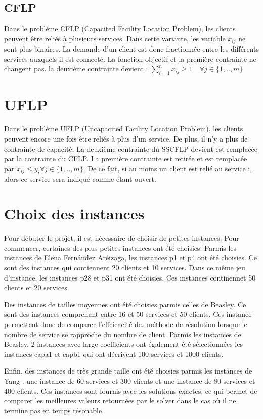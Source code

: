 \subsection{CFLP}

Dans le problème CFLP (Capacited Facility Location Problem), les clients peuvent être reliés à plusieurs services. Dans cette variante, les variable $x_{ij}$ ne sont plus binaires. La demande d'un client est donc fractionnée entre les différents services auxquels il est connecté. La fonction objectif et la première contrainte ne changent pas. la deuxième contrainte devient :
$ \sum \limits_{i=1}^n x_{ij} \geq 1 \quad \forall j \in \{1,..,m\}$

\section {UFLP}

Dans le problème UFLP (Uncapacited Facility Location Problem), les clients peuvent encore une fois être reliés à plus d'un service. De plus, il n'y a plus de contrainte de capacité.
La deuxième contrainte du SSCFLP devient est remplacée par la contrainte du CFLP.
La première contrainte est retirée et est remplacée par
$ x_{ij} \leq y_i \forall j \in \{1,..,m\}$. De ce fait, si au moins un client est relié au service i, alors ce service sera indiqué comme étant ouvert.


\section{Choix des instances}

Pour débuter le projet, il est nécessaire de choisir de petites instances.
Pour commencer, certaines des plus petites instances ont été choisies.
Parmis les instances de Elena Fernández Aréizaga, les instances p1 et p4 ont été choisies. Ce sont des instances qui contiennent 20 clients et 10 services.
Dans ce même jeu d'instance, les instances p28 et p31 ont été choisies. Ces instances continennet 50 clients et 20 services. \newline

Des instances de tailles moyennes ont été choisies parmis celles de Beasley. Ce sont des instances comprenant entre 16 et 50 services et 50 clients.
Ces instance permettent donc de comparer l'effcicacité des méthode de résolution lorsque le nombre de service se rapproche du nombre de client.
Parmis les instances de Beasley, 2 instances avec large coefficients ont également été sélectionnées les instances capa1 et capb1 qui ont décrivent 100 services et 1000 clients. \newline

Enfin, des instances de très grande taille ont été choisies parmis les instances de Yang : une instance de 60 services et 300 clients et une instance de 80 services et 400 clients.
Ces instances sont fournis avec les solutions exactes, ce qui permet de comparer les meilleures valeurs retournées par le solver dans le cas où il ne termine pas en temps résonable.
